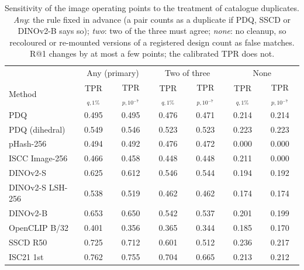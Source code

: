 \begin{table}[!t]
\centering
\footnotesize
\caption{Sensitivity of the image operating points to the treatment of catalogue duplicates. \emph{Any}: the rule fixed in advance (a pair counts as a duplicate if PDQ, SSCD or DINOv2-B says so); \emph{two}: two of the three must agree; \emph{none}: no cleanup, so recoloured or re-mounted versions of a registered design count as false matches. R@1 changes by at most a few points; the calibrated TPR does not.}
\label{tab:sens}
\setlength{\tabcolsep}{3pt}
\begin{tabular}{lcccccc}
\toprule
 & \multicolumn{2}{c}{Any (primary)} & \multicolumn{2}{c}{Two of three} & \multicolumn{2}{c}{None} \\
Method & TPR$_{q,1\%}$ & TPR$_{p,10^{-7}}$ & TPR$_{q,1\%}$ & TPR$_{p,10^{-7}}$ & TPR$_{q,1\%}$ & TPR$_{p,10^{-7}}$ \\
\midrule
PDQ & 0.495 & 0.495 & 0.476 & 0.471 & 0.214 & 0.214 \\
PDQ (dihedral) & 0.549 & 0.546 & 0.523 & 0.523 & 0.223 & 0.223 \\
pHash-256 & 0.494 & 0.492 & 0.476 & 0.472 & 0.000 & 0.000 \\
ISCC Image-256 & 0.466 & 0.458 & 0.448 & 0.448 & 0.211 & 0.000 \\
DINOv2-S & 0.625 & 0.612 & 0.546 & 0.544 & 0.194 & 0.192 \\
DINOv2-S LSH-256 & 0.538 & 0.519 & 0.462 & 0.462 & 0.174 & 0.174 \\
DINOv2-B & 0.653 & 0.650 & 0.542 & 0.537 & 0.201 & 0.199 \\
OpenCLIP B/32 & 0.401 & 0.356 & 0.365 & 0.344 & 0.185 & 0.170 \\
SSCD R50 & 0.725 & 0.712 & 0.601 & 0.512 & 0.236 & 0.217 \\
ISC21 1st & 0.762 & 0.755 & 0.704 & 0.665 & 0.213 & 0.212 \\
\bottomrule
\end{tabular}

\end{table}
